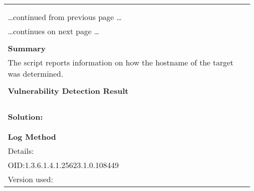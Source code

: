 \documentclass{article}
\begin{document}
\begin{longtable}{|p{}|}
\hline
\rowcolor{gvm_log}{\color{white}{Log (CVSS: 0.0) }}\\
\rowcolor{gvm_log}{\color{white}{NVT: Hostname Determination Reporting}}\\
\hline
\endfirsthead
\hfill\ldots continued from previous page \ldots \\
\hline
\endhead
\hline
\ldots continues on next page \ldots \\
\endfoot
\hline
\endlastfoot
\\
\textbf{Summary}\\
The script reports information on how the hostname
  of the target was determined.\\

        \hline
        \\
\textbf{Vulnerability Detection Result}\\
\rowcolor{white}{\verb=Hostname determination for IP 192.168.178.28:=}\\
\rowcolor{white}{\verb=Hostname|Source=}\\
\rowcolor{white}{\verb=s20-fe-von-carina.fritz.box|Reverse-DNS=}\\

          \hline
          \\
\textbf{Solution:}\\
\\


        \hline
        \\
\textbf{Log Method}\\
Details:
\rowcolor{white}{\verb=Hostname Determination Reporting=}\\
OID:1.3.6.1.4.1.25623.1.0.108449\\
Version used:
\rowcolor{white}{\verb=2018-11-19T11:11:31Z=}\\
\end{longtable}
\end{document}
